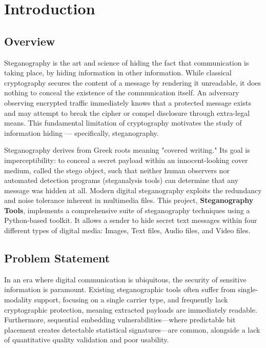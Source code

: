 \documentclass[12pt,a4paper]{report}
\begin{document}

\chapter{Introduction}

\section{Overview}
Steganography is the art and science of hiding the fact that communication is taking place, by hiding information in other information. While classical cryptography secures the content of a message by rendering it unreadable, it does nothing to conceal the existence of the communication itself. An adversary observing encrypted traffic immediately knows that a protected message exists and may attempt to break the cipher or compel disclosure through extra-legal means. This fundamental limitation of cryptography motivates the study of information hiding — specifically, steganography. 

Steganography derives from Greek roots meaning "covered writing." Its goal is imperceptibility: to conceal a secret payload within an innocent-looking cover medium, called the stego object, such that neither human observers nor automated detection programs (steganalysis tools) can determine that any message was hidden at all. Modern digital steganography exploits the redundancy and noise tolerance inherent in multimedia files. This project, \textbf{Steganography Tools}, implements a comprehensive suite of steganography techniques using a Python-based toolkit. It allows a sender to hide secret text messages within four different types of digital media: Images, Text files, Audio files, and Video files. 

\section{Problem Statement}
In an era where digital communication is ubiquitous, the security of sensitive information is paramount. Existing steganographic tools often suffer from single-modality support, focusing on a single carrier type, and frequently lack cryptographic protection, meaning extracted payloads are immediately readable. Furthermore, sequential embedding vulnerabilities—where predictable bit placement creates detectable statistical signatures—are common, alongside a lack of quantitative quality validation and poor usability. 
\end{document}
